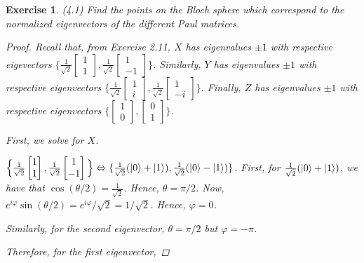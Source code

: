 \documentclass[11pt]{article}
\newcommand\0{\mathbf{0}}
\newcommand\<{\langle}
\renewcommand\>{\rangle}
\renewcommand\iff{\Leftrightarrow}
\renewcommand\phi{\varphi}
\newtheorem{exercise}[theorem]{Exercise}
\begin{document}
\begin{exercise} (4.1) Find the points on the Bloch sphere which correspond to the normalized eigenvectors of the different Paul matrices. 
\begin{proof}
	
Recall that, from Exercise 2.11, $X$ has eigenvalues $\pm 1$ with respective eigevectors $\Big\{ \frac{1}{\sqrt{2}}\begin{bmatrix} 1 \\ 1 \end{bmatrix}, \frac{1}{\sqrt{2}}\begin{bmatrix} 1 \\ -1 \end{bmatrix} \Big\}$. Similarly, $Y$ has eigenvalues $\pm 1$ with respective eigenvectors $\Big\{ \frac{1}{\sqrt{2}}\begin{bmatrix} 1 \\ i \end{bmatrix} , \frac{1}{\sqrt{2}} \begin{bmatrix} 1 \\ -i \end{bmatrix} \Big\}$. Finally, $Z$ has eigenvalues $\pm 1$ with respective eigenvectors $\Big\{ \begin{bmatrix} 1 \\ 0 \end{bmatrix} , \begin{bmatrix} 0 \\ 1 \end{bmatrix} \Big\}$.
	
First, we solve for $X$. 
	
$\Big\{ \frac{1}{\sqrt{2}}\begin{bmatrix} 1 \\ 1 \end{bmatrix}, \frac{1}{\sqrt{2}}\begin{bmatrix} 1 \\ -1 \end{bmatrix} \Big\} \iff \{ \frac{1}{\sqrt{2}}(\ket{0} + \ket{1}) , \frac{1}{\sqrt{2}}(\ket{0} - \ket{1}) \} $. First, for $\frac{1}{\sqrt{2}}(\ket{0} + \ket{1})$, we have that $\cos(\theta / 2) = \frac{1}{\sqrt{2}}$. Hence, $\theta = \pi / 2$. Now, $e^{i\phi} \sin (\theta / 2) = e^{i \phi} / \sqrt{2} = 1 / \sqrt{2}$. Hence, $\phi = 0$. 
	
Similarly, for the second eigenvector, $\theta = \pi / 2$ but $\phi = - \pi$.
	
Therefore, for the first eigenvector, 
	

\end{proof}
\end{exercise}
\end{document}
